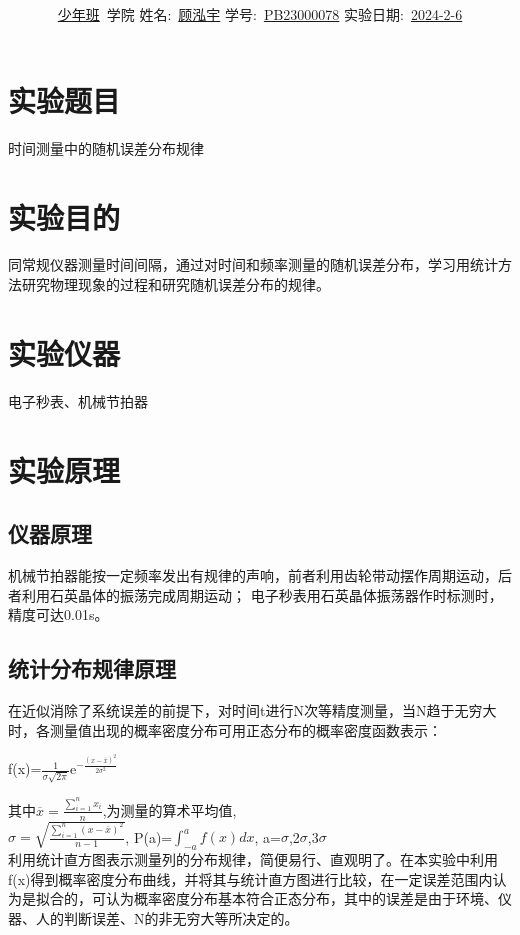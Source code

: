 \documentclass[12pt,a4paper]{article}
\title{\Huge{\textbf{\uuline{实\ 验\ 报\ 告}}}}
\author{\uline{少年班}\ 学院 \quad 姓名:\ \uline{顾泓宇} \quad 学号:\ \uline{PB23000078} \quad 实验日期:\ \uline{2024-2-6} }
\date{}
\begin{document}
	\maketitle
	
	\section{实验题目}
	时间测量中的随机误差分布规律
	
	\section{实验目的}
	同常规仪器测量时间间隔，通过对时间和频率测量的随机误差分布，学习用统计方法研究物理现象的过程和研究随机误差分布的规律。
	
	\section{实验仪器}
	电子秒表、机械节拍器
	
	\section{实验原理}
	\subsection{仪器原理}
	机械节拍器能按一定频率发出有规律的声响，前者利用齿轮带动摆作周期运动，后者利用石英晶体的振荡完成周期运动；
	电子秒表用石英晶体振荡器作时标测时，精度可达0.01s。
	\subsection{统计分布规律原理}
	在近似消除了系统误差的前提下，对时间t进行N次等精度测量，当N趋于无穷大时，各测量值出现的概率密度分布可用正态分布的概率密度函数表示：\\
	\begin{center}
		\large{f(x)=$\frac{1}{\sigma\sqrt{2\pi}}\mathrm{e}^{-\frac{(x-\overline{x})^{2}}{2\sigma^{2}}}$}
	\end{center}
	其中$\overline{x}=\frac{\sum\limits_{i=1}^{n}x_{i}}{n}$,为测量的算术平均值,\\
	$\sigma=\sqrt{\frac{\sum\limits_{i=1}^{n}(x-\overline{x})^{2}}{n-1}}$,
	\quad P(a)=$\int_{-a}^{a}f(x)dx$, \quad a=$\sigma$,2$\sigma$,3$\sigma$\\
	利用统计直方图表示测量列的分布规律，简便易行、直观明了。在本实验中利用f(x)得到概率密度分布曲线，并将其与统计直方图进行比较，在一定误差范围内认为是拟合的，可认为概率密度分布基本符合正态分布，其中的误差是由于环境、仪器、人的判断误差、N的非无穷大等所决定的。
	
\end{document}
